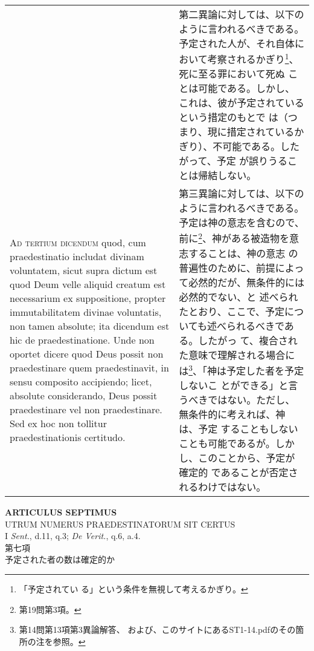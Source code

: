 \documentclass[10pt]{jsarticle} %
\begin{document}
\begin{longtable}{p{21em}p{21em}}
&


第二異論に対しては、以下のように言われるべきである。
予定された人が、それ自体において考察されるかぎり\footnote{「予定されてい
 る」という条件を無視して考えるかぎり。}、死に至る罪において死ぬ
 ことは可能である。しかし、これは、彼が予定されているという措定のもとで
 は（つまり、現に措定されているかぎり）、不可能である。したがって、予定
 が誤りうることは帰結しない。

\\


{\scshape Ad tertium dicendum} quod, cum praedestinatio
includat divinam voluntatem, sicut supra dictum est quod Deum velle
aliquid creatum est necessarium ex suppositione, propter immutabilitatem
divinae voluntatis, non tamen absolute; ita dicendum est hic de
praedestinatione. Unde non oportet dicere quod Deus possit non
praedestinare quem praedestinavit, in sensu composito accipiendo; licet,
absolute considerando, Deus possit praedestinare vel non
praedestinare. Sed ex hoc non tollitur praedestinationis certitudo.

&

第三異論に対しては、以下のように言われるべきである。
予定は神の意志を含むので、前に\footnote{第19問第3項。}、神がある被造物を意志することは、神の意志
 の普遍性のために、前提によって必然的だが、無条件的には必然的でない、と
 述べられたとおり、ここで、予定についても述べられるべきである。したがっ
 て、複合された意味で理解される場合には\footnote{第14問第13項第3異論解答、
 および、このサイトにあるST1-14.pdfのその箇所の注を参照。}、「神は予定した者を予定しないこ
 とができる」と言うべきではない。ただし、無条件的に考えれば、神は、予定
 することもしないことも可能であるが。しかし、このことから、予定が確定的
 であることが否定されるわけではない。


\end{longtable}
\newpage

\begin{center}
 {\Large {\bf ARTICULUS SEPTIMUS}}\\
 {\large UTRUM NUMERUS PRAEDESTINATORUM SIT CERTUS}\\
 {\footnotesize I {\itshape Sent.}, d.11, q.3; {\itshape De Verit.},
 q.6, a.4.}\\
 {\Large 第七項\\予定された者の数は確定的か}
\end{center}
\end{document}
